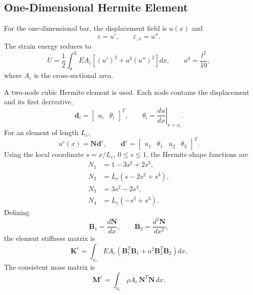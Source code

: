 \documentclass[final,3p,times,fleqn]{elsarticle}
\begin{document}
\subsection{One-Dimensional Hermite Element}
\label{subsec:one_dimensional_hermite_element}

For the one-dimensional bar, the displacement field is $u(x)$ and
\begin{equation}
\label{eq:1d_strain_gradient}
\varepsilon=u',
\qquad
\varepsilon_{,x}=u'' .
\end{equation}
The strain energy reduces to
\begin{equation}
\label{eq:1d_fem_energy}
U
=
\frac{1}{2}
\int_0^L
EA_c\left[(u')^2+a^2(u'')^2\right]dx,
\qquad
a^2=\frac{l^2}{10},
\end{equation}
where $A_c$ is the cross-sectional area.

A two-node cubic Hermite element is used. Each node contains the
displacement and its first derivative,
\begin{equation}
\label{eq:1d_dofs}
\mathbf{d}_i
=
\begin{bmatrix}
u_i & \theta_i
\end{bmatrix}^{T},
\qquad
\theta_i
=
\left.\frac{du}{dx}\right|_{x=x_i}.
\end{equation}
For an element of length $L_e$,
\begin{equation}
\label{eq:1d_hermite_interpolation}
u^e(x)
=
\mathbf{N}\mathbf{d}^e,
\qquad
\mathbf{d}^e
=
\begin{bmatrix}
u_1 & \theta_1 & u_2 & \theta_2
\end{bmatrix}^{T}.
\end{equation}
Using the local coordinate $s=x/L_e$, $0\leq s\leq1$, the Hermite shape
functions are
\begin{align}
N_1 &= 1-3s^2+2s^3, \label{eq:1d_H_N1}\\
N_2 &= L_e(s-2s^2+s^3), \label{eq:1d_H_N2}\\
N_3 &= 3s^2-2s^3, \label{eq:1d_H_N3}\\
N_4 &= L_e(-s^2+s^3). \label{eq:1d_H_N4}
\end{align}
Defining
\begin{equation}
\label{eq:1d_B_matrices}
\mathbf{B}_1
=
\frac{d\mathbf{N}}{dx},
\qquad
\mathbf{B}_2
=
\frac{d^2\mathbf{N}}{dx^2},
\end{equation}
the element stiffness matrix is
\begin{equation}
\label{eq:1d_element_stiffness}
\mathbf{K}^{e}
=
\int_{x_e}
EA_c
\left(
\mathbf{B}_1^T\mathbf{B}_1
+
a^2\mathbf{B}_2^T\mathbf{B}_2
\right)dx .
\end{equation}
The consistent mass matrix is
\begin{equation}
\label{eq:1d_element_mass}
\mathbf{M}^{e}
=
\int_{x_e}
\rho A_c\,\mathbf{N}^T\mathbf{N}\,dx .
\end{equation}
\end{document}
